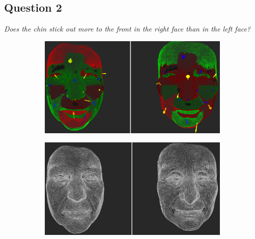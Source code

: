 \subsection{Question 2}
\label{attch:complete_study_results-question2}

\begin{center}{\it Does the chin stick out more to the front in the right face than in the left face?}\end{center}

\begin{figure}[h]
\centering
\begin{subfigure}{0.49\textwidth}
\includegraphics[width=\textwidth]{./img-study/pair3.PNG}
\caption{}
\label{fig:study-1-3}
\end{subfigure}
\begin{subfigure}{0.49\textwidth}
\includegraphics[width=\textwidth]{./img-study/pair1.PNG}
\caption{}
\label{fig:study-1-1}
\end{subfigure}


\end{figure}

